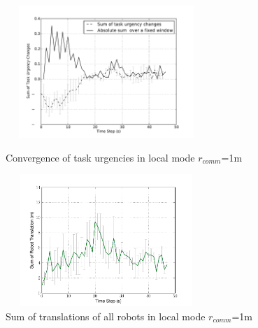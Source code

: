\documentclass[letterpaper, 10 pt, times, conference]{ieeeconf} %
\begin{document}
\begin{figure}
\begin{minipage}[t]{0.5\linewidth}
\centering
\includegraphics[height=5cm,width=3in]{images/local-1m/TaskUrgencyConvergence-1m}
\caption{\small Convergence of task urgencies in local mode $r_{comm}$=1m}
\label{fig:local1m-convergence} %
\end{minipage}
\hspace{0.5cm}
\begin{minipage}[t]{0.5\linewidth}
\centering
\includegraphics[height=5cm,width=3in]{images/local-1m/DeltaTranslationStat}
\caption{\small Sum of translations of all robots in local mode $r_{comm}$=1m }
\label{fig:local1m-tr} %
\end{minipage}
\end{figure}
\end{document}
